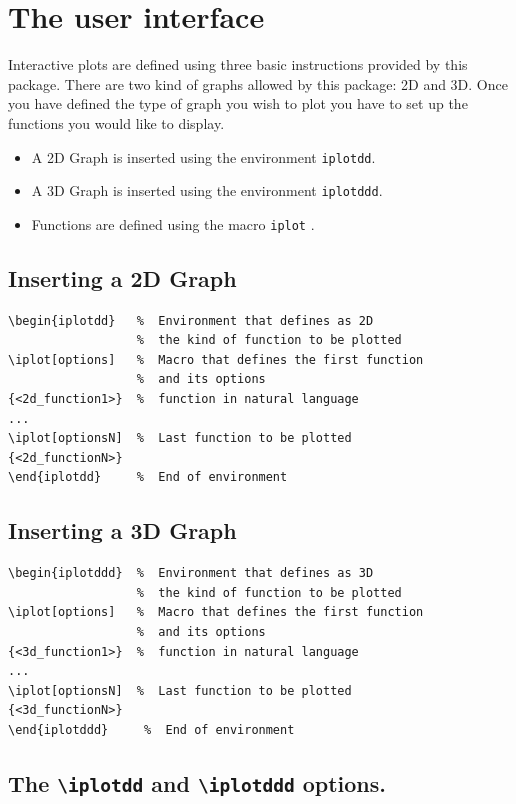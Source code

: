 \documentclass[a4paper,12pt]{article}
\begin{document}
\section{The user interface}
Interactive plots are defined using three basic instructions provided by this package. There are two kind of graphs allowed by this package: 2D and 3D. Once you have defined the type of graph you wish to plot you have to set up the functions you would like to display. 
\begin{itemize}
\item A 2D Graph is inserted using the environment \verb+iplotdd+.
\item A 3D Graph is inserted using the environment \verb+iplotddd+.
\item Functions are defined using the macro \verb+iplot+ .
\end{itemize}

\subsection{Inserting a 2D Graph}
\begin{verbatim}          
\begin{iplotdd}   %  Environment that defines as 2D
                  %  the kind of function to be plotted
\iplot[options]   %  Macro that defines the first function 
                  %  and its options
{<2d_function1>}  %  function in natural language
...
\iplot[optionsN]  %  Last function to be plotted
{<2d_functionN>}            
\end{iplotdd}     %  End of environment
\end{verbatim}

\subsection{Inserting a 3D Graph}
\begin{verbatim}  
\begin{iplotddd}  %  Environment that defines as 3D
                  %  the kind of function to be plotted
\iplot[options]   %  Macro that defines the first function 
                  %  and its options
{<3d_function1>}  %  function in natural language
...
\iplot[optionsN]  %  Last function to be plotted
{<3d_functionN>}
\end{iplotddd}     %  End of environment
\end{verbatim}

\subsection{The \texttt{\textbackslash iplotdd} and \texttt{\textbackslash iplotddd} options.}
\end{document}
